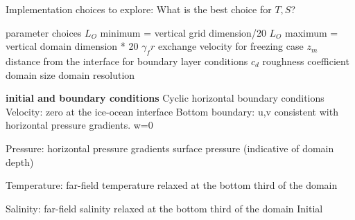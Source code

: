 \documentclass[letterpaper,10pt]{report}
\begin{document}
	Implementation choices to explore:
	What is the best choice for $T, S$?
	
	parameter choices
	$L_O$ minimum = vertical grid dimension/20
	$L_O$ maximum = vertical domain dimension * 20
	$\gamma_fr$ exchange velocity for freezing case
	$z_m$ distance from the interface for boundary layer conditions
	$c_d$ roughness coefficient
	domain size
	domain resolution
	
	
	
	\textbf{initial and boundary conditions}
	Cyclic horizontal boundary conditions
	Velocity:
	zero at the ice-ocean interface
	Bottom boundary: u,v consistent with horizontal pressure gradients. w=0
	
	Pressure:
	horizontal pressure gradients
	surface pressure (indicative of domain depth)
	
	Temperature:
	far-field temperature relaxed at the bottom third of the domain
	
	Salinity:
	far-field salinity relaxed at the bottom third of the domain
	Initial 
	
\end{document}
